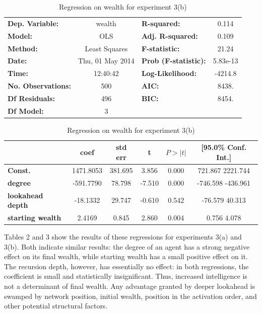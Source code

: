 \documentclass{article}
\begin{document}
\begin{table}
\begin{tabular}{lclc}
\toprule
\textbf{Dep. Variable:}    &      wealth      & \textbf{  R-squared:         } &    0.114  \\
\textbf{Model:}            &       OLS        & \textbf{  Adj. R-squared:    } &    0.109  \\
\textbf{Method:}           &  Least Squares   & \textbf{  F-statistic:       } &    21.24  \\
\textbf{Date:}             & Thu, 01 May 2014 & \textbf{  Prob (F-statistic):} & 5.83e-13  \\
\textbf{Time:}             &     12:40:42     & \textbf{  Log-Likelihood:    } &  -4214.8  \\
\textbf{No. Observations:} &         500      & \textbf{  AIC:               } &    8438.  \\
\textbf{Df Residuals:}     &         496      & \textbf{  BIC:               } &    8454.  \\
\textbf{Df Model:}         &           3      & \textbf{                     } &           \\
\bottomrule
\end{tabular}

\begin{tabular}{lccccc}
\toprule
                         & \textbf{coef} & \textbf{std err} & \textbf{t} & \textbf{$P>|t|$} & \textbf{[95.0\% Conf. Int.]}  \\
\midrule
\textbf{Const.}          &    1471.8053  &      381.695     &     3.856  &      0.000     &       721.867  2221.744      \\
\textbf{degree}          &    -591.7790  &       78.798     &    -7.510  &      0.000     &      -746.598  -436.961      \\
\textbf{lookahead depth}       &     -18.1332  &       29.747     &    -0.610  &      0.542     &       -76.579    40.313      \\
\textbf{starting wealth} &       2.4169  &        0.845     &     2.860  &      0.004     &         0.756     4.078      \\
\bottomrule
\end{tabular}
\caption{Regression on wealth for experiment 3(b)}
\end{table}

Tables 2 and 3 show the results of these regressions for experiments 3(a) and 3(b). Both indicate similar results: the degree of an agent has a strong negative effect on its final wealth, while starting wealth has a small positive effect on it. The recursion depth, however, has essentially no effect: in both regressions, the coefficient is small and statistically insignificant. Thus, increased intelligence is not a determinant of final wealth. Any advantage granted by deeper lookahead is swamped by network position, initial wealth, position in the activation order, and other potential structural factors.
\end{document}
